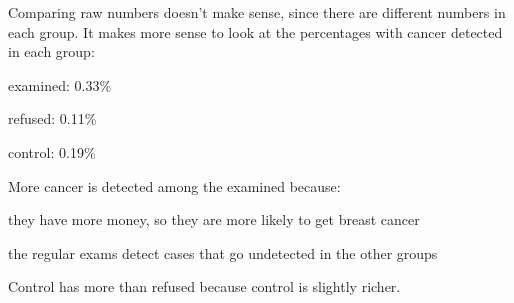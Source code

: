 \documentclass[landscape]{exam}
\begin{document}
\begin{itemize*}
      \begin{solution}
        Comparing raw numbers doesn't make sense, since there are different
        numbers in each group.  It makes more sense to look at the percentages
        with cancer detected in each group:
        \begin{itemize*}
          \item examined: 0.33\%
          \item refused: 0.11\%
          \item control: 0.19\%
        \end{itemize*}

        More cancer is detected among the examined because:
        \begin{itemize*}
          \item they have more money, so they are more likely to get breast
            cancer
          \item the regular exams detect cases that go undetected in the other
            groups
        \end{itemize*}

        Control has more than refused because control is slightly richer.
      \end{solution}

  \end{itemize*}
\end{document}
